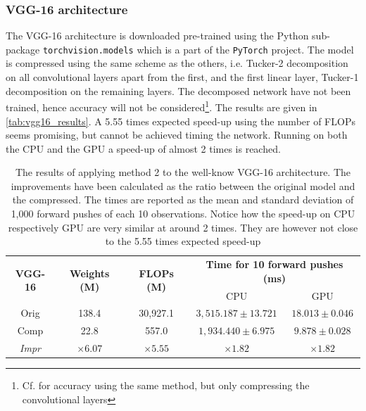 \subsubsection{VGG-16 architecture}
The VGG-16 architecture is downloaded pre-trained using the Python sub-package \texttt{torchvision.models} which is a part of the \texttt{PyTorch} project\cite{torchvision}. The model is compressed using the same scheme as the others, i.e. Tucker-2 decomposition on all convolutional layers apart from the first, and the first linear layer, Tucker-1 decomposition on the remaining layers. The decomposed network have not been trained, hence accuracy will not be considered\footnote{Cf. \cite{Kim2016} for accuracy using the same method, but only compressing the convolutional layers}. The results are given in \autoref{tab:vgg16_results}. A 5.55 times expected speed-up using the number of FLOPs seems promising, but cannot be achieved timing the network. Running on both the CPU and the GPU a speed-up of almost 2 times is reached.
\begin{table}[H]
\centering
\captionsetup{width=.95\linewidth}
\caption{The results of applying method 2 to the well-know VGG-16 architecture. The improvements have been calculated as the ratio between the original model and the compressed. The times are reported as the mean and standard deviation of 1,000 forward pushes of each 10 observations. Notice how the speed-up on CPU respectively GPU are very similar at around 2 times. They are however not close to the 5.55 times expected speed-up}
\label{tab:vgg16_results}
\begin{tabular}{c|cccc}
\multirow{2}{*}{\textbf{VGG-16}} & \multirow{2}{*}{\textbf{Weights (M)}} & \multirow{2}{*}{\textbf{FLOPs (M)}} & \multicolumn{2}{c}{\textbf{Time for 10 forward pushes (ms)}} \\
                                 &                                       &                                     & CPU                          & GPU                        \\ \hline
Orig                             & 138.4                                 & 30,927.1                            & $3,515.187 \pm 13.721 $        & $18.013 \pm 0.046 $        \\
Comp                             & 22.8                                  & 557.0                               & $1,934.440 \pm 6.975$       & $ 9.878 \pm 0.028 $        \\
\textit{Impr}                    & $ \times 6.07 $                       & $\times 5.55$                       & $\times 1.82 $               & $ \times 1.82 $           
\end{tabular}
\end{table}
